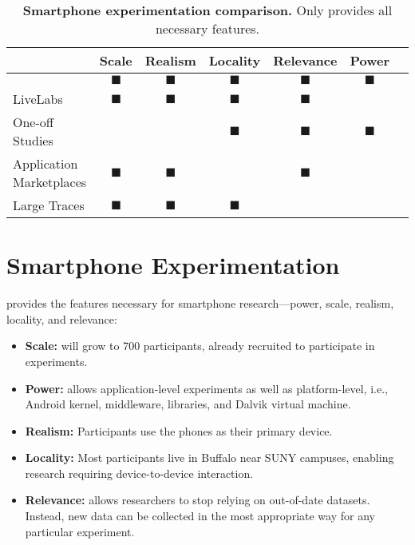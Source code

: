 \begin{table*}[t]
\begin{tabularx}{\textwidth}{Xcccccc}
& {\normalsize{\textbf{Scale}}} &
{\normalsize{\textbf{Realism}}} &
{\normalsize{\textbf{Locality}}} &
{\normalsize{\textbf{Relevance}}} &
{\normalsize{\textbf{Power}}} \\
\toprule

{\large \PhoneLab{}}
& $\blacksquare$ & $\blacksquare$ & $\blacksquare$ & $\blacksquare$ & $\blacksquare$ \\
\toprule

LiveLabs &
$\blacksquare$ & $\blacksquare$ & $\blacksquare$ & $\blacksquare$ & & \\
\midrule

One-off Studies &
& & $\blacksquare$ & $\blacksquare$ & $\blacksquare$ \\
\midrule

Application Marketplaces &
$\blacksquare$ & $\blacksquare$ & & $\blacksquare$ & \\
\midrule

Large Traces &
$\blacksquare$ & $\blacksquare$ & $\blacksquare$ & & \\
\bottomrule

\end{tabularx}
\caption{\textbf{Smartphone experimentation comparison.} Only \PhoneLab{}
provides all necessary features.}
\label{tab:comparison}
\end{table*}

\section{Smartphone Experimentation}
\label{sec-comparison}

\PhoneLab{} provides the features necessary for smartphone research---power,
scale, realism, locality, and relevance:

\begin{itemize}[nosep,leftmargin=*]
\vspace*{0.08in}
\item {\bf Scale:} \PhoneLab{} will grow to 700 participants, already
recruited to participate in experiments.
\item {\bf Power:} \PhoneLab{} allows application-level experiments as well
as platform-level, i.e., Android kernel, middleware, libraries, and Dalvik
virtual machine.
\item {\bf Realism:} Participants use the phones as their primary device.
\item {\bf Locality:} Most participants live in Buffalo near SUNY campuses,
enabling research requiring device-to-device interaction.
\item {\bf Relevance:} \PhoneLab{} allows researchers to stop relying on
out-of-date datasets. Instead, new data can be collected in the most
appropriate way for any particular experiment.
\vspace*{0.08in}
\end{itemize}

